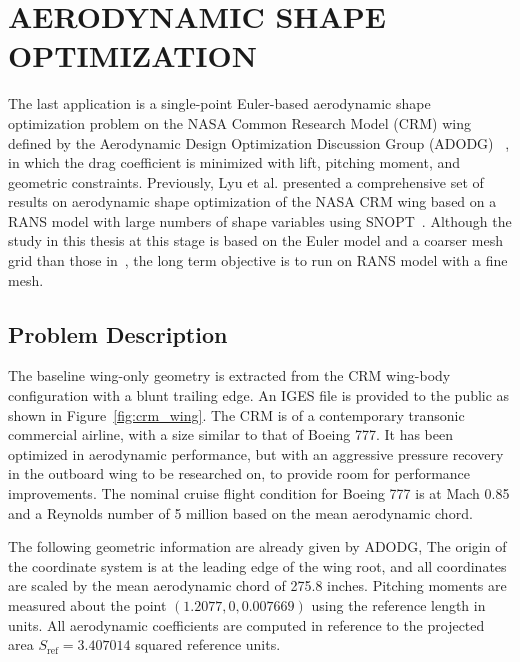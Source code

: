  
\chapter{AERODYNAMIC SHAPE OPTIMIZATION}
The last application is a single-point Euler-based aerodynamic shape optimization problem on the NASA Common Research Model (CRM) wing~\cite{crm_wing} defined by the Aerodynamic Design Optimization Discussion Group (ADODG) ~\cite{adodg}, in which the drag coefficient is minimized with lift, pitching moment, and geometric constraints.    Previously, Lyu et al. presented a comprehensive set of results on aerodynamic shape optimization of the NASA CRM wing based on a RANS model with large numbers of shape variables using SNOPT~\cite{2015lyu_crm}. Although the study in this thesis at this stage is based on the Euler model and a coarser mesh grid than those in~\cite{2015lyu_crm}, the long term objective is to run on RANS model with a fine mesh.   

\section{Problem Description}
The baseline wing-only geometry is extracted from the CRM wing-body configuration with a blunt trailing edge. An IGES file is provided to the public as shown in Figure~\ref{fig:crm_wing}. The CRM is of a contemporary transonic commercial airline, with a size similar to that of Boeing 777. It has been optimized in aerodynamic performance, but with an aggressive pressure recovery in the outboard wing to be researched on, to provide room for performance improvements. 
The nominal cruise flight condition for Boeing 777 is at Mach 0.85 and a Reynolds number of 5 million based on the mean aerodynamic chord. 

The following geometric information are already given by ADODG, 
The origin of the coordinate system is at the leading edge of the wing root, and all coordinates are scaled by the mean aerodynamic chord of 275.8 inches. Pitching moments are measured about the point $(1.2077, 0, 0.007669)$ using the reference length in units. All aerodynamic coefficients are computed in reference to the projected area $S_{\text{ref}}=3.407014$ squared reference units. 

